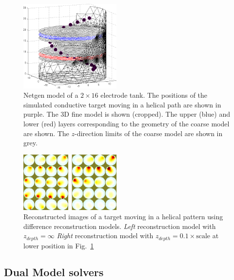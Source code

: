 \documentclass[12pt,draft]{iopart}
\begin{document}
\begin{figure}[tbh]
\begin{center}
 \includegraphics[width= 0.45\textwidth, bb=0 0 466 278]{../../tutorial/dual_model/centre_slice02a.png}
\caption{ \label{fig:dual_model}
\small
Netgen model of a $2\times 16$ electrode tank. The positions of the simulated
conductive target moving in a helical path are shown in purple. The
3D fine model is shown (cropped). The upper (blue) and lower (red)
layers corresponding to the geometry of the coarse model are shown. The
$z$-direction limits of the coarse model are shown in grey.
}
\end{center}

\end{figure}

\begin{figure}[tbh]
\begin{center}
 \includegraphics[width= 0.45\textwidth, bb=0 0 588 508]{../paper-EIT2008/figs/centre_slice04a_crop.png}
\caption{ \label{fig:dual_model_reconst}
\small
Reconstructed images of a target moving in a helical pattern using
difference reconstruction models.
{\em Left} reconstruction model with  $z_{depth}=\infty$
{\em Right} reconstruction model with $z_{depth}= 0.1\times \mbox{scale}$
at lower position in Fig.~\ref{fig:dual_model}
}
\end{center}
\vspace{-0.5cm}
\end{figure}

\subsection{Dual Model solvers}
\end{document}
